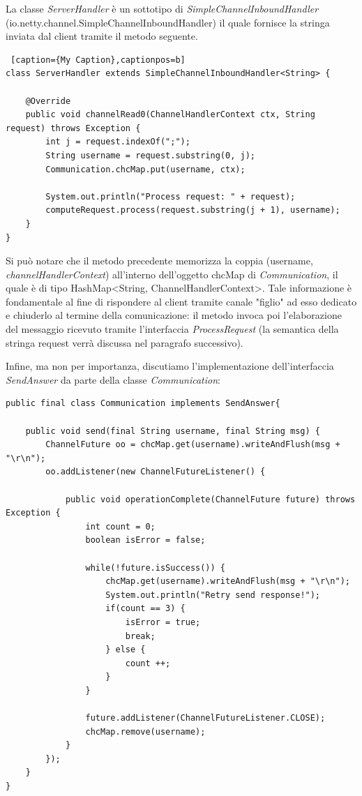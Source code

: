 La classe \textit{ServerHandler} è un sottotipo di \textit{SimpleChannelInboundHandler} \\(io.netty.channel.SimpleChannelInboundHandler) il quale fornisce la stringa inviata dal client tramite il metodo seguente.

\begin{lstlisting} [caption={My Caption},captionpos=b]
class ServerHandler extends SimpleChannelInboundHandler<String> {
	
	@Override
	public void channelRead0(ChannelHandlerContext ctx, String request) throws Exception {
		int j = request.indexOf(";");
		String username = request.substring(0, j);
		Communication.chcMap.put(username, ctx);
		
		System.out.println("Process request: " + request);
		computeRequest.process(request.substring(j + 1), username);
	}
}
\end{lstlisting}

Si può notare che il metodo precedente memorizza la coppia (username, \textit{channelHandlerContext}) all'interno dell'oggetto chcMap di \textit{Communication}, il quale è di tipo HashMap<String, ChannelHandlerContext>.
Tale informazione è fondamentale al fine di rispondere al client tramite canale "figlio" ad esso dedicato e chiuderlo al termine della comunicazione: il metodo invoca poi l'elaborazione del messaggio ricevuto tramite l'interfaccia \textit{ProcessRequest} (la semantica della stringa request verrà discussa nel paragrafo successivo).

\newpage
Infine, ma non per importanza, discutiamo l'implementazione dell'interfaccia \textit{SendAnswer} da parte della classe \textit{Communication}:
\begin{lstlisting}[caption={My Caption},captionpos=b]
public final class Communication implements SendAnswer{

	public void send(final String username, final String msg) {	
		ChannelFuture oo = chcMap.get(username).writeAndFlush(msg + "\r\n");
		oo.addListener(new ChannelFutureListener() {
		
			public void operationComplete(ChannelFuture future)	throws Exception {
				int count = 0;
				boolean isError = false;
				
				while(!future.isSuccess()) {
					chcMap.get(username).writeAndFlush(msg + "\r\n");
					System.out.println("Retry send response!");
					if(count == 3) {
						isError = true;
						break;
					} else {
						count ++;
					}
				}
				
				future.addListener(ChannelFutureListener.CLOSE);
				chcMap.remove(username);
			}
		});
	}
}
\end{lstlisting}

